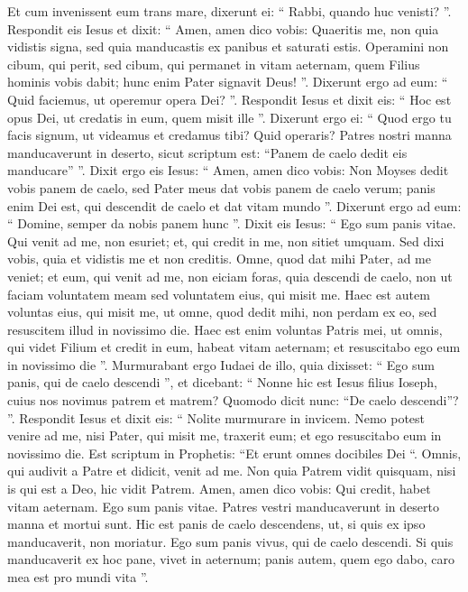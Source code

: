\begin{biblechapter}
\begin{biblechapter}
\begin{biblechapter}
\begin{biblechapter}
\begin{biblechapter}
\begin{biblechapter}
\verse Et cum invenissent eum trans mare, dixerunt ei: “ Rabbi, quando huc venisti? ”.
 \verse Respondit eis Iesus et dixit: “ Amen, amen dico vobis: Quaeritis me, non quia vidistis signa, sed quia manducastis ex panibus et saturati estis. 
\verse Operamini non cibum, qui perit, sed cibum, qui permanet in vitam aeternam, quem Filius hominis vobis dabit; hunc enim Pater signavit Deus! ”. 
\verse Dixerunt ergo ad eum: “ Quid faciemus, ut operemur opera Dei? ”. 
\verse Respondit Iesus et dixit eis: “ Hoc est opus Dei, ut credatis in eum, quem misit ille ”.
 \verse Dixerunt ergo ei: “ Quod ergo tu facis signum, ut videamus et credamus tibi? Quid operaris? 
\verse Patres nostri manna manducaverunt in deserto, sicut scriptum est: “Panem de caelo dedit eis manducare” ”. 
\verse Dixit ergo eis Iesus: “ Amen, amen dico vobis: Non Moyses dedit vobis panem de caelo, sed Pater meus dat vobis panem de caelo verum; 
\verse panis enim Dei est, qui descendit de caelo et dat vitam mundo ”. 
\verse Dixerunt ergo ad eum: “ Domine, semper da nobis panem hunc ”. 
\verse Dixit eis Iesus: “ Ego sum panis vitae. Qui venit ad me, non esuriet; et, qui credit in me, non sitiet umquam. 
\verse Sed dixi vobis, quia et vidistis me et non creditis. 
\verse Omne, quod dat mihi Pater, ad me veniet; et eum, qui venit ad me, non eiciam foras, 
\verse quia descendi de caelo, non ut faciam voluntatem meam sed voluntatem eius, qui misit me. 
\verse Haec est autem voluntas eius, qui misit me, ut omne, quod dedit mihi, non perdam ex eo, sed resuscitem illud in novissimo die. 
\verse Haec est enim voluntas Patris mei, ut omnis, qui videt Filium et credit in eum, habeat vitam aeternam; et resuscitabo ego eum in novissimo die ”.
 \verse Murmurabant ergo Iudaei de illo, quia dixisset: “ Ego sum panis, qui de caelo descendi ”, 
\verse et dicebant: “ Nonne hic est Iesus filius Ioseph, cuius nos novimus patrem et matrem? Quomodo dicit nunc: “De caelo descendi”? ”.
 \verse Respondit Iesus et dixit eis: “ Nolite murmurare in invicem. 
\verse Nemo potest venire ad me, nisi Pater, qui misit me, traxerit eum; et ego resuscitabo eum in novissimo die. 
\verse Est scriptum in Prophetis: “Et erunt omnes docibiles Dei “. Omnis, qui audivit a Patre et didicit, venit ad me. 
\verse Non quia Patrem vidit quisquam, nisi is qui est a Deo, hic vidit Patrem. 
\verse Amen, amen dico vobis: Qui credit, habet vitam aeternam.
 \verse Ego sum panis vitae. 
\verse Patres vestri manducaverunt in deserto manna et mortui sunt. 
\verse Hic est panis de caelo descendens, ut, si quis ex ipso manducaverit, non moriatur. 
\verse Ego sum panis vivus, qui de caelo descendi. Si quis manducaverit ex hoc pane, vivet in aeternum; panis autem, quem ego dabo, caro mea est pro mundi vita ”.

\end{biblechapter}
\end{biblechapter}
\end{biblechapter}
\end{biblechapter}
\end{biblechapter}
\end{biblechapter}
